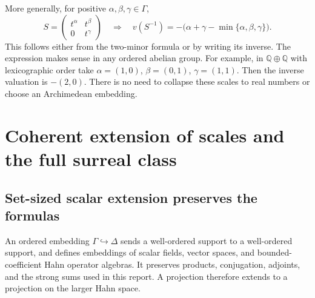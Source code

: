 \documentclass[11pt,letterpaper]{article}
\numberwithin{equation}{section}
\theoremstyle{definition}
\theoremstyle{remark}
\newcommand{\Q}{\mathbb Q}
\begin{document}
More generally, for positive $\alpha,\beta,\gamma\in\Gamma$,
\[
 S=\begin{pmatrix}t^\alpha&t^\beta\\0&t^\gamma\end{pmatrix}
 \quad\Longrightarrow\quad
 v(S^{-1})=-\bigl(\alpha+\gamma-
                       \min\{\alpha,\beta,\gamma\}\bigr).
\]
This follows either from the two-minor formula or by writing its
inverse. The expression makes sense in any ordered abelian group.
For example, in $\Q\oplus\Q$ with lexicographic order take
$\alpha=(1,0)$, $\beta=(0,1)$, $\gamma=(1,1)$. Then the inverse
valuation is $-(2,0)$. There is no need to collapse these scales to
real numbers or choose an Archimedean embedding.

\section{Coherent extension of scales and the full surreal class}
\label{hgeo:sec:global}

\subsection{Set-sized scalar extension preserves the formulas}
An ordered embedding $\Gamma\hookrightarrow\Delta$ sends a
well-ordered support to a well-ordered support, and defines embeddings
of scalar fields, vector spaces, and bounded-coefficient Hahn
operator algebras. It preserves products, conjugation, adjoints,
and the strong sums used in this report. A projection therefore
extends to a projection on the larger Hahn space.
\end{document}
